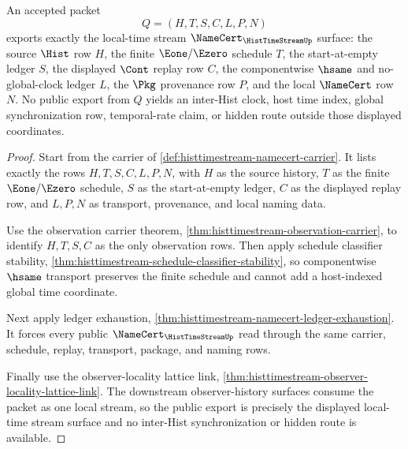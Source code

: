 \begin{theorem}
\label{thm:histtimestream-public-export}
An accepted packet
$$
Q=(H,T,S,C,L,P,N)
$$
exports exactly the local-time stream $\NameCert_{\HistTimeStreamUp}$ surface: the source $\Hist$ row $H$, the finite $\Eone/\Ezero$ schedule $T$, the start-at-empty ledger $S$, the displayed $\Cont$ replay row $C$, the componentwise $\hsame$ and no-global-clock ledger $L$, the $\Pkg$ provenance row $P$, and the local $\NameCert$ row $N$. No public export from $Q$ yields an inter-Hist clock, host time index, global synchronization row, temporal-rate claim, or hidden route outside those displayed coordinates.
\end{theorem}
\begin{proof}
Start from the carrier of \autoref{def:histtimestream-namecert-carrier}. It lists exactly the rows $H,T,S,C,L,P,N$, with $H$ as the source history, $T$ as the finite $\Eone/\Ezero$ schedule, $S$ as the start-at-empty ledger, $C$ as the displayed replay row, and $L,P,N$ as transport, provenance, and local naming data.

Use the observation carrier theorem, \autoref{thm:histtimestream-observation-carrier}, to identify $H,T,S,C$ as the only observation rows. Then apply schedule classifier stability, \autoref{thm:histtimestream-schedule-classifier-stability}, so componentwise $\hsame$ transport preserves the finite schedule and cannot add a host-indexed global time coordinate.

Next apply ledger exhaustion, \autoref{thm:histtimestream-namecert-ledger-exhaustion}. It forces every public $\NameCert_{\HistTimeStreamUp}$ read through the same carrier, schedule, replay, transport, package, and naming rows.

Finally use the observer-locality lattice link, \autoref{thm:histtimestream-observer-locality-lattice-link}. The downstream observer-history surfaces consume the packet as one local stream, so the public export is precisely the displayed local-time stream surface and no inter-Hist synchronization or hidden route is available.
\end{proof}

